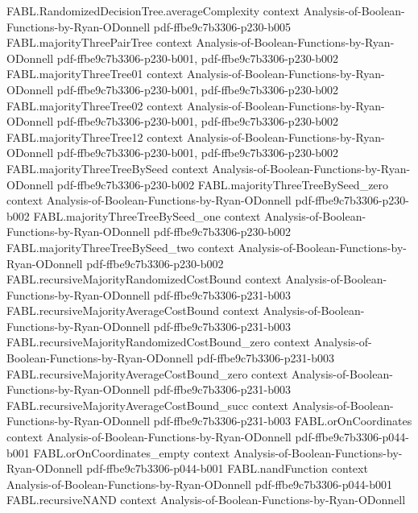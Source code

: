 \begin{theorem}
\proofstep
  {FABL.RandomizedDecisionTree.averageComplexity}
  {context}
  {Analysis-of-Boolean-Functions-by-Ryan-ODonnell}
  {pdf-ffbe9c7b3306-p230-b005}
\proofstep
  {FABL.majorityThreePairTree}
  {context}
  {Analysis-of-Boolean-Functions-by-Ryan-ODonnell}
  {pdf-ffbe9c7b3306-p230-b001,
    pdf-ffbe9c7b3306-p230-b002}
\proofstep
  {FABL.majorityThreeTree01}
  {context}
  {Analysis-of-Boolean-Functions-by-Ryan-ODonnell}
  {pdf-ffbe9c7b3306-p230-b001,
    pdf-ffbe9c7b3306-p230-b002}
\proofstep
  {FABL.majorityThreeTree02}
  {context}
  {Analysis-of-Boolean-Functions-by-Ryan-ODonnell}
  {pdf-ffbe9c7b3306-p230-b001,
    pdf-ffbe9c7b3306-p230-b002}
\proofstep
  {FABL.majorityThreeTree12}
  {context}
  {Analysis-of-Boolean-Functions-by-Ryan-ODonnell}
  {pdf-ffbe9c7b3306-p230-b001,
    pdf-ffbe9c7b3306-p230-b002}
\proofstep
  {FABL.majorityThreeTreeBySeed}
  {context}
  {Analysis-of-Boolean-Functions-by-Ryan-ODonnell}
  {pdf-ffbe9c7b3306-p230-b002}
\proofstep
  {FABL.majorityThreeTreeBySeed_zero}
  {context}
  {Analysis-of-Boolean-Functions-by-Ryan-ODonnell}
  {pdf-ffbe9c7b3306-p230-b002}
\proofstep
  {FABL.majorityThreeTreeBySeed_one}
  {context}
  {Analysis-of-Boolean-Functions-by-Ryan-ODonnell}
  {pdf-ffbe9c7b3306-p230-b002}
\proofstep
  {FABL.majorityThreeTreeBySeed_two}
  {context}
  {Analysis-of-Boolean-Functions-by-Ryan-ODonnell}
  {pdf-ffbe9c7b3306-p230-b002}
\proofstep
  {FABL.recursiveMajorityRandomizedCostBound}
  {context}
  {Analysis-of-Boolean-Functions-by-Ryan-ODonnell}
  {pdf-ffbe9c7b3306-p231-b003}
\proofstep
  {FABL.recursiveMajorityAverageCostBound}
  {context}
  {Analysis-of-Boolean-Functions-by-Ryan-ODonnell}
  {pdf-ffbe9c7b3306-p231-b003}
\proofstep
  {FABL.recursiveMajorityRandomizedCostBound_zero}
  {context}
  {Analysis-of-Boolean-Functions-by-Ryan-ODonnell}
  {pdf-ffbe9c7b3306-p231-b003}
\proofstep
  {FABL.recursiveMajorityAverageCostBound_zero}
  {context}
  {Analysis-of-Boolean-Functions-by-Ryan-ODonnell}
  {pdf-ffbe9c7b3306-p231-b003}
\proofstep
  {FABL.recursiveMajorityAverageCostBound_succ}
  {context}
  {Analysis-of-Boolean-Functions-by-Ryan-ODonnell}
  {pdf-ffbe9c7b3306-p231-b003}
\proofstep
  {FABL.orOnCoordinates}
  {context}
  {Analysis-of-Boolean-Functions-by-Ryan-ODonnell}
  {pdf-ffbe9c7b3306-p044-b001}
\proofstep
  {FABL.orOnCoordinates_empty}
  {context}
  {Analysis-of-Boolean-Functions-by-Ryan-ODonnell}
  {pdf-ffbe9c7b3306-p044-b001}
\proofstep
  {FABL.nandFunction}
  {context}
  {Analysis-of-Boolean-Functions-by-Ryan-ODonnell}
  {pdf-ffbe9c7b3306-p044-b001}
\proofstep
  {FABL.recursiveNAND}
  {context}
  {Analysis-of-Boolean-Functions-by-Ryan-ODonnell}

\end{theorem}
